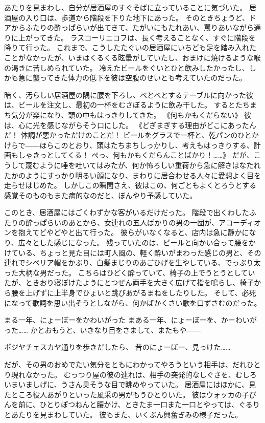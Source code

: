 あたりを見まわし、自分が居酒屋のすぐそばに立っていることに気づいた。
居酒屋の入り口は、歩道から階段を下りた地下にあった。
そのときちょうど、ドアからふたりの酔っぱらいが出てきて、たがいにもたれあい、罵りあいながら通りに上がってきた。
ラスコーリニコフは、長く考えることなく、すぐに階段を降りて行った。
これまで、こうしたたぐいの居酒屋にいちども足を踏み入れたことがなかったが、いまはくるくる眩暈がしていたし、おまけに焼けるような喉の渇きに苦しめられていた。
冷えたビールをぐいとひと飲みしたかったし、しかも急に襲ってきた体力の低下を彼は空腹のせいとも考えていたのだった。

暗く、汚らしい居酒屋の隅に腰を下ろし、べとべとするテーブルに向かった彼は、ビールを注文し、最初の一杯をむさぼるように飲み干した。
するとたちまち気分が楽になり、頭の中もはっきりしてきた。
《何もかもくだらない》
彼は、心に光を感じながらそう口にした。
《どぎまぎする理由がどこにあったんだ！
体調が悪かっただけのことだ！
ビールをグラスで一杯と、乾パンのひとかけらで――ほらこのとおり、頭はたちまちしっかりし、考えもはっきりする、計画もしゃきっとしてくる！
ぺっ、何もかもくだらんことばかり！……》
だが、こうして蔑むように唾を吐いてはみたが、何か怖ろしい重荷から急に解きはなたれたかのようにすっかり明るい顔になり、まわりに居合わせる人々に愛想よく目を走らせはじめた。
しかしこの瞬間さえ、彼はこの、何ごともよくとろうとする感覚そのものもまた病的なのだと、ぼんやり予感していた。

このとき、居酒屋にはごくわずかな客がいるだけだった。
階段で出くわしたふたりの酔っぱらいのあとから、女連れの五人ばかりの男の一団が、アコーディオンを抱えてどやどやと出て行った。
彼らがいなくなると、店内は急に静かになり、広々とした感じになった。
残っていたのは、ビールと向かい合って腰をかけている、ちょっと見た目には町人風の、軽く酔いがまわった感じの男と、その連れでシベリア帽をかぶり、白髪まじりのあごひげを生やしている、でっぷり太った大柄な男だった。
こちらはひどく酔っていて、椅子の上でうとうとしていたが、ときおり寝ぼけたようにとつぜん両手を大きく広げて指を鳴らし、椅子から腰を上げずに上半身でひょいと跳びあがるまねをしたりした。
そして、必死になって歌詞を思い出そうとしながら、何かばかくさい歌を口ずさむのだった。

  まる一年、にょーぼーをかわいがった
  まある一年、にょーぼーを、かーわいがった……
  かとおもうと、いきなり目をさまして、またもや――

  ポジヤチェスカヤ通りを歩きだしたら、
  昔のにょーぼー、見っけた……

だが、その男のおめでたい気分をともにわかってやろうという相手は、だれひとり現れなかった。
むっつり屋の彼の連れは、相手の突発的なしぐさを、むしろいまいましげに、うさん臭そうな目で眺めやっていた。
居酒屋にはほかに、見たところ役人あがりといった風采の男がもうひとりいた。
彼はウォッカの子びんを前に、ひとりぽつねんと腰かけ、ときたま一口また一口とやっては、ぐるりとあたりを見まわしていた。
彼もまた、いくぶん興奮ぎみの様子だった。 
